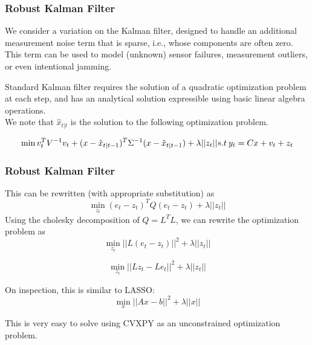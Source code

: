 \documentclass{beamer}
\begin{document}
\begin{frame}
\frametitle{Robust Kalman Filter}

We consider a variation on the Kalman filter, designed to handle an additional measurement noise term that is sparse, i.e., whose components are often zero.\\
This term can be used to model (unknown) sensor failures,
measurement outliers, or even intentional jamming. 

Standard Kalman filter requires the solution of a quadratic optimization problem at each step, and has an analytical solution expressible
using basic linear algebra operations.\\

We note that $\hat{x}_{t|t}$ is the solution to the following optimization problem.

\begin{center}
    

\begin{equation*}
    \min v_{t}^T V^{-1}v_{t}+ (x-\hat{x}_{t|t-1})^T \Sigma^{-1}(x-\hat{x}_{t|t-1})+ \lambda ||z_t|| \\
    
   
    s.t \: y_t=Cx+v_t+z_t
\end{equation*}
\end{center} 

\end{frame}

\begin{frame}
\frametitle{Robust Kalman Filter}
This can be rewritten (with appropriate substitution) as
\begin{equation*}
    \min_{z_t} (e_t-z_t)^T Q(e_t-z_t)+ \lambda ||z_t|| 
\end{equation*}
Using the cholesky decomposition of $Q=L^T L$, we can rewrite the optimization problem as\\
\begin{equation*}
    \min_{z_t} ||L(e_t-z_t)||^2 + \lambda ||z_t|| 
\end{equation*}

\begin{equation*}
    \min_{z_t} ||L z_t -L e_t||^2 + \lambda ||z_t|| 
\end{equation*}

On inspection, this is similar to LASSO:\\ 
\begin{equation*}
    \min_{x} ||Ax -b||^2 + \lambda ||x|| 
\end{equation*}

This is very easy to solve using CVXPY as an unconstrained optimization problem.

\end{frame}
\end{document}
